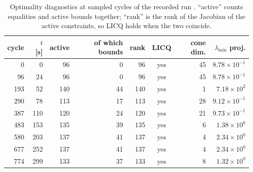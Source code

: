 \begin{table}[htbp]
  \centering
  \small
  \caption{Optimality diagnostics at sampled cycles of the recorded run \resBag. ``active'' counts equalities and active bounds together; ``rank'' is the rank of the Jacobian of the active constraints, so LICQ holds when the two coincide.}
  \label{res:tab:kkt}
  \begin{tabular}{rrrrrcrr}
    \toprule
    cycle & $t$ [s] & active & of which bounds & rank & LICQ & cone dim. & $\lambda_{\min}$ proj. \\
    \midrule
    0 & 0 & 96 & 0 & 96 & yes & 45 & $8.78\times 10^{-1}$ \\
    96 & 24 & 96 & 0 & 96 & yes & 45 & $8.78\times 10^{-1}$ \\
    193 & 52 & 140 & 44 & 140 & yes & 1 & $7.18\times 10^{2}$ \\
    290 & 78 & 113 & 17 & 113 & yes & 28 & $9.12\times 10^{-1}$ \\
    387 & 110 & 120 & 24 & 120 & yes & 21 & $9.73\times 10^{-1}$ \\
    483 & 153 & 135 & 39 & 135 & yes & 6 & $1.38\times 10^{0}$ \\
    580 & 203 & 137 & 41 & 137 & yes & 4 & $2.34\times 10^{0}$ \\
    677 & 252 & 137 & 41 & 137 & yes & 4 & $2.34\times 10^{0}$ \\
    774 & 299 & 133 & 37 & 133 & yes & 8 & $1.32\times 10^{0}$ \\
    \bottomrule
  \end{tabular}
\end{table}


